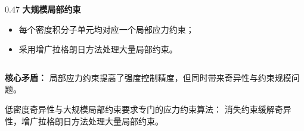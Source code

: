 \documentclass[notheorems]{beamer}
\begin{document}
\begin{frame}
{\begin{center}
\begin{tcolorbox}
{\begin{columns}[T, totalwidth=\linewidth]
							\begin{column}{0.47\linewidth}
								{\fontsize{8.3}{10.5}\selectfont\bfseries\sffamily
									\enspace 大规模局部约束}
								
								\vspace{0.65em}
								
								\setlength{\leftmargini}{1.0em}
								\begin{itemize}
									\setlength{\itemsep}{5pt}
									\setlength{\topsep}{1pt}
									\setlength{\parsep}{0pt}
									\setlength{\parskip}{0pt}
									\item 每个密度积分子单元均对应一个局部应力约束；
									\item 采用增广拉格朗日方法处理大量局部约束。
								\end{itemize}
							\end{column}
							
						\end{columns}
						
						\begin{center}
							{\fontsize{7.8}{10.0}\selectfont\sffamily
								\textbf{核心矛盾：}
								局部应力约束提高了强度控制精度，但同时带来奇异性与约束规模问题。
							}
						\end{center}
					}
				\end{tcolorbox}
			\end{center}
			
			\begin{tcolorbox}[
				colback=structure.fg,
				colframe=structure.fg,
				coltext=white,
				boxrule=0.45pt,
				arc=3pt,
				left=7pt, right=7pt, top=3pt, bottom=3pt]
				\centering
				{\fontsize{7.8}{9.8}\selectfont\sffamily
					低密度奇异性与大规模局部约束要求专门的应力约束算法：
					消失约束缓解奇异性，增广拉格朗日方法处理大量局部约束。
				}
			\end{tcolorbox}
		}
		
	\end{frame}
	
	
\end{document}
